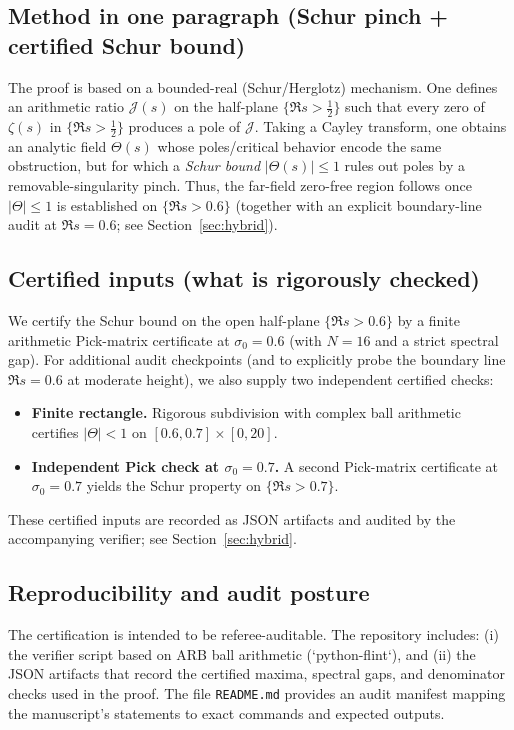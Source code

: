 \documentclass[11pt]{article}
\begin{document}
\subsection*{Method in one paragraph (Schur pinch + certified Schur bound)}
The proof is based on a bounded-real (Schur/Herglotz) mechanism.
One defines an arithmetic ratio $\mathcal J(s)$ on the half-plane $\{\Re s>\tfrac12\}$ such that every zero of $\zeta(s)$ in $\{\Re s>\tfrac12\}$ produces a pole of $\mathcal J$.
Taking a Cayley transform, one obtains an analytic field $\Theta(s)$ whose poles/critical behavior encode the same obstruction, but for which a \emph{Schur bound} $|\Theta(s)|\le 1$ rules out poles by a removable-singularity pinch.
Thus, the far-field zero-free region follows once $|\Theta|\le 1$ is established on $\{\Re s>0.6\}$ (together with an explicit boundary-line audit at $\Re s=0.6$; see Section~\ref{sec:hybrid}).

\subsection*{Certified inputs (what is rigorously checked)}
We certify the Schur bound on the open half-plane $\{\Re s>0.6\}$ by a finite arithmetic Pick-matrix certificate at $\sigma_0=0.6$ (with $N=16$ and a strict spectral gap).
For additional audit checkpoints (and to explicitly probe the boundary line $\Re s=0.6$ at moderate height), we also supply two independent certified checks:
\begin{itemize}
\item \textbf{Finite rectangle.} Rigorous subdivision with complex ball arithmetic certifies $|\Theta|<1$ on $[0.6,0.7]\times[0,20]$.
\item \textbf{Independent Pick check at $\sigma_0=0.7$.} A second Pick-matrix certificate at $\sigma_0=0.7$ yields the Schur property on $\{\Re s>0.7\}$.
\end{itemize}
These certified inputs are recorded as JSON artifacts and audited by the accompanying verifier; see Section~\ref{sec:hybrid}.

\subsection*{Reproducibility and audit posture}
The certification is intended to be referee-auditable.
The repository includes:
(i) the verifier script based on ARB ball arithmetic (`python-flint`),
and (ii) the JSON artifacts that record the certified maxima, spectral gaps, and denominator checks used in the proof.
The file \texttt{README.md} provides an audit manifest mapping the manuscript’s statements to exact commands and expected outputs.
\end{document}
